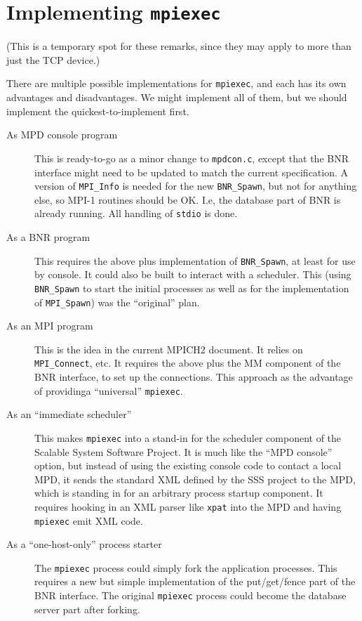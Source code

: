 \documentclass{article}
\def\code#1{\texttt{#1}}
\let\file=\code
\begin{document}
\section{Implementing \code{mpiexec}}
\label{sec:mpiexec}

(This is a temporary spot for these remarks, since they may apply to more than
just the TCP device.)

There are multiple possible implementations for \code{mpiexec}, and each has
its own advantages and disadvantages.  We might implement all of them, but we
should implement the quickest-to-implement first.

\begin{description}
\item[As MPD console program] This is ready-to-go as a minor change to
  \file{mpdcon.c}, except that the BNR interface might need to be updated to
  match 
  the current specification.  A version of \code{MPI_Info} is needed for the
  new 
  \code{BNR_Spawn}, but not for anything else, so MPI-1 routines should be OK.
  I.e, 
  the database part of BNR is already running.  All handling of \code{stdio}
  is done.
\item[As a BNR program] This requires the above plus implementation of
  \code{BNR_Spawn}, at least for use by console.  It could also be built to
  interact 
  with a scheduler.  This (using \code{BNR_Spawn} to start the initial
  processes as 
  well as for the implementation of \code{MPI_Spawn}) was the ``original''
  plan.
\item[As an MPI program] This is the idea in the current MPICH2 document.  It
  relies on \code{MPI_Connect}, etc.  It requires the above plus the MM
  component 
  of the BNR interface, to set up the connections.  This approach as the
  advantage of providinga ``universal'' \code{mpiexec}. 
\item[As an ``immediate scheduler''] This makes \code{mpiexec} into a stand-in
  for the scheduler component of the Scalable System Software Project.  It is
  much like the ``MPD console'' option, but instead of using the existing
  console code to contact a local MPD, it sends the standard XML defined by
  the SSS project to the MPD, which is standing in for an arbitrary process
  startup component.  It requires hooking in an XML parser like \code{xpat}
  into the MPD and having \code{mpiexec} emit XML code.
\item[As a ``one-host-only'' process starter] The \code{mpiexec} process could
  simply fork the application processes.  This requires a new but simple
  implementation of the put/get/fence part of the BNR interface.  The original
  \code{mpiexec} process could become the database server part after forking.
\end{description}
\end{document}
